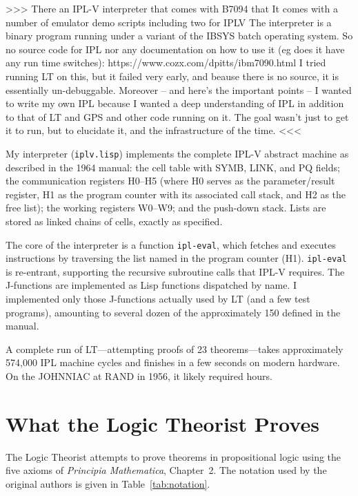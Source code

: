 \documentclass[journal]{IEEEtran}
\begin{document}
>>> There an IPL-V interpreter that comes with B7094 that It comes
with a number of emulator demo scripts including two for IPLV The
interpreter is a binary program running under a variant of the IBSYS
batch operating system. So no source code for IPL nor any
documentation on how to use it (eg does it have any run time
switches): https://www.cozx.com/dpitts/ibm7090.html I tried running LT
on this, but it failed very early, and beause there is no source, it
is essentially un-debuggable. Moreover -- and here's the important
points -- I wanted to write my own IPL because I wanted a deep
understanding of IPL in addition to that of LT and GPS and other code
running on it. The goal wasn't just to get it to run, but to elucidate
it, and the infrastructure of the time. <<<

My interpreter (\texttt{iplv.lisp}) implements the complete IPL-V
abstract machine as described in the 1964 manual: the cell table with
SYMB, LINK, and PQ fields; the communication registers H0--H5 (where
H0 serves as the parameter/result register, H1 as the program counter
with its associated call stack, and H2 as the free list); the working
registers W0--W9; and the push-down stack. Lists are stored as linked
chains of cells, exactly as specified.

The core of the interpreter is a function \texttt{ipl-eval}, which
fetches and executes instructions by traversing the list named in the
program counter (H1). \texttt{ipl-eval} is re-entrant, supporting the
recursive subroutine calls that IPL-V requires. The J-functions are
implemented as Lisp functions dispatched by name. I implemented only
those J-functions actually used by LT (and a few test programs),
amounting to several dozen of the approximately 150 defined in the
manual.

A complete run of LT---attempting proofs of 23 theorems---takes
approximately 574,000 IPL machine cycles and finishes in a few seconds
on modern hardware. On the JOHNNIAC at RAND in 1956, it likely
required hours.

\section{What the Logic Theorist Proves}
\label{sec:results}

The Logic Theorist attempts to prove theorems in propositional logic
using the five axioms of \textit{Principia Mathematica}, Chapter~2.
The notation used by the original authors is given in
Table~\ref{tab:notation}.
\end{document}
